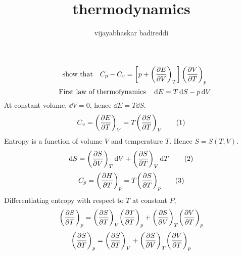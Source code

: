\documentclass[12pt]{article}
\title{thermodynamics}
\author{vijayabhaskar badireddi}
\date{}
\begin{document}
\[\qq{show that}C_p-C_v=\left[p+\qty(\pdv{E}{V})_T\right]\qty(\pdv{V}{T})_p\]
\[\qq{First law of thermofynamics}\dd{E}=T\dd{S}-p\dd{V}\]
At constant volume, $\dd{V}=0$, hence $\dd{E}=T\dd{S}$.
\[C_v=\qty(\pdv{E}{T})_V=T\qty(\pdv{S}{T})_V\tag{1}\]
Entropy is a function of volume $V$ and temperature $T$. Hence $S=S(T,V)$.
\[\dd{S}=\qty(\pdv{S}{V})_T\dd{V}+\qty(\pdv{S}{T})_V\dd{T}\tag{2}\]
\[C_p=\qty(\pdv{H}{T})_p=T\qty(\pdv{S}{T})_p\tag{3}\]
Differentiating entropy with respect to $T$ at constant $P$,
\[\qty(\pdv{S}{T})_p=\qty(\pdv{S}{T})_V\qty(\pdv{T}{T})_p+\qty(\pdv{S}{V})_T\qty(\pdv{V}{T})_p\]
\[\qty(\pdv{S}{T})_p=\qty(\pdv{S}{T})_V+\qty(\pdv{S}{V})_T\qty(\pdv{V}{T})_p\]
\end{document}
